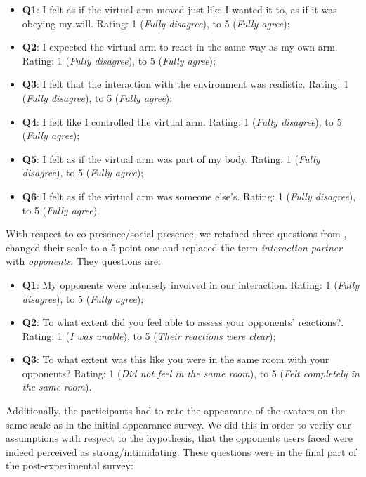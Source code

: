 \begin{itemize}
\label{enum:ownershipQuestions}
\itemsep0em
    \item \textbf{Q1}: I felt as if the virtual arm moved just like I wanted it to, as if it was obeying my will. Rating: 1 (\textit{Fully disagree}), to 5 (\textit{Fully agree});
    \item \textbf{Q2}: I expected the virtual arm to react in the same way as my own arm. Rating: 1 (\textit{Fully disagree}), to 5 (\textit{Fully agree});
    \item \textbf{Q3}: I felt that the interaction with the environment was realistic. Rating: 1 (\textit{Fully disagree}), to 5 (\textit{Fully agree});
    \item \textbf{Q4}: I felt like I controlled the virtual arm. Rating: 1 (\textit{Fully disagree}), to 5 (\textit{Fully agree});
    \item \textbf{Q5}: I felt as if the virtual arm was part of my body. Rating: 1 (\textit{Fully disagree}), to 5 (\textit{Fully agree});
    \item \textbf{Q6}: I felt as if the virtual arm was someone else’s. Rating: 1 (\textit{Fully disagree}), to 5 (\textit{Fully agree}).
\end{itemize}
With respect to co-presence/social presence, we retained three questions from \cite{nowak2003effect}, changed their scale to a 5-point one and replaced the term \textit{interaction partner} with \textit{opponents}. They questions are:
\begin{itemize}
\label{enum:copresenceQuestions}
\itemsep0em
    \item \textbf{Q1}: My opponents were intensely involved in our interaction. Rating: 1 (\textit{Fully disagree}), to 5 (\textit{Fully agree});
    \item \textbf{Q2}: To what extent did you feel able to assess your opponents’ reactions?. Rating: 1 (\textit{I was unable}), to 5 (\textit{Their reactions were clear});
    \item \textbf{Q3}: To what extent was this like you were in the same room with your opponents? Rating: 1 (\textit{Did not feel in the same room}), to 5 (\textit{Felt completely in the same room}).
\end{itemize}
Additionally, the participants had to rate the appearance of the avatars on the same scale as in the initial appearance survey. We did this in order to verify our assumptions with respect to the hypothesis, that the opponents users faced were indeed perceived as strong/intimidating. These questions were in the final part of the post-experimental survey:
